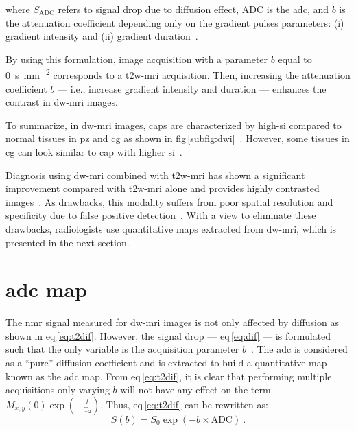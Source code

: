 \noindent where $S_{\text{ADC}}$ refers to signal drop due to diffusion effect, $\text{ADC}$ is the \acl{adc}, and $b$ is the attenuation coefficient depending only on the gradient pulses parameters: (i) gradient intensity and (ii) gradient duration~\cite{LeBihan1986}.

By using this formulation, image acquisition with a parameter $b$ equal to \SI{0}{\second\per\milli\metre\squared} corresponds to a \ac{t2w}-\ac{mri} acquisition.
Then, increasing the attenuation coefficient $b$ --- i.e., increase gradient intensity and duration --- enhances the contrast in \ac{dw}-\ac{mri} images.

To summarize, in \ac{dw}-\ac{mri} images, \acp{cap} are characterized by high-\ac{si} compared to normal tissues in \ac{pz} and \ac{cg} as shown in \acs{fig}\,\ref{subfig:dwi}~\cite{Barentsz2012}.
However, some tissues in \ac{cg} can look similar to \ac{cap} with higher \ac{si}~\cite{Barentsz2012}.

Diagnosis using \ac{dw}-\ac{mri} combined with \ac{t2w}-\ac{mri} has shown a significant improvement compared with \ac{t2w}-\ac{mri} alone and provides highly contrasted images~\cite{Shimofusa2005,Padhani2011,Choi2007}.
As drawbacks, this modality suffers from poor spatial resolution and specificity due to false positive detection~\cite{Choi2007}.
With a view to eliminate these drawbacks, radiologists use quantitative maps extracted from \ac{dw}-\ac{mri}, which is presented in the next section.

\section{\acs*{adc} map}\label{subsec:chp2:imaging:adc} 
The \ac{nmr} signal measured for \ac{dw}-\ac{mri} images is not only affected by diffusion as shown in \acs{eq}\,\eqref{eq:t2dif}.
However, the signal drop --- \acs{eq}\,\eqref{eq:dif} --- is formulated such that the only variable is the acquisition parameter $b$~\cite{LeBihan1986}.
The \ac{adc} is considered as a ``pure'' diffusion coefficient and is extracted to build a quantitative map known as the \acs{adc} map.
From \acs{eq}\,\eqref{eq:t2dif}, it is clear that performing multiple acquisitions only varying $b$ will not have any effect on the term  $M_{x,y}(0) \exp \left( - \frac{t}{\text{T}_2} \right)$.
Thus, \acs{eq}\,\eqref{eq:t2dif} can be rewritten as:
\begin{equation}
	S(b) = S_0 \exp \left( -b \times \text{ADC} \right) \ .
	\label{eq:t2adcrew}
\end{equation}

